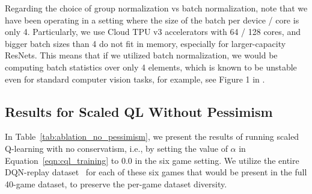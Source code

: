 \begin{table}[h]
    \centering
    \centering
    \vspace{-0.4cm}
    \caption{\footnotesize{{\textbf{Ablations for the backbone architecture in the 40-game setting} with ResNet 101. Observe that learned spatial embeddings leads to around 80\% improvement in performance.}}} %
    \label{tab:ablation_backbone_40_game}
    \vspace{0.25cm}
\end{table}

{Regarding the choice of group normalization vs batch normalization, note that we have been operating in a setting where the size of the batch per device / core is only 4. Particularly, we use Cloud TPU v3 accelerators with 64 / 128 cores, and bigger batch sizes than 4 do not fit in memory, especially for larger-capacity ResNets. This means that if we utilized batch normalization, we would be computing batch statistics over only 4 elements, which is known to be unstable even for standard computer vision tasks, for example, see Figure 1 in \citet{wu2018group}.} 

\vspace{-0.2cm}
\subsection{{{Results for Scaled QL Without Pessimism}}}
\label{app:no_pessimism}
\vspace{-0.2cm}
{In Table~\ref{tab:ablation_no_pessimism}, we present the results of running scaled Q-learning with no conservatism, i.e., by setting the value of $\alpha$ in Equation~\ref{eqn:cql_training} to 0.0 in the six game setting. We utilize the entire DQN-replay dataset~\citep{agarwal2019optimistic} for each of these six games that would be present in the full 40-game dataset, to preserve the per-game dataset diversity.}

